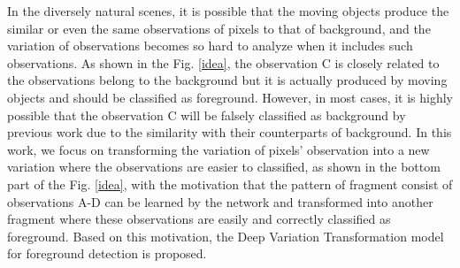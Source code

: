 \documentclass[journal]{IEEEtran}
\newcommand{\reffig}[1]{Fig. \ref{#1}}
\begin{document}
In the diversely natural scenes,
it is possible that the moving objects produce the similar or even the same observations of pixels to that of background,
and the variation of observations becomes so hard to analyze when it includes such observations.
As shown in the \reffig{idea},
the observation C is closely related to the observations belong to the background but it is actually produced by moving objects and should be classified as foreground.
However, in most cases, it is highly possible that the observation C will be falsely classified as background by previous work due to the similarity with their counterparts of background.
In this work, we focus on transforming the variation of pixels' observation into a new variation where the observations are easier to classified,
as shown in the bottom part of the \reffig{idea},
with the motivation that the pattern of fragment consist of observations A-D can be learned by the network and transformed into another fragment where these observations are easily and correctly classified as foreground.
Based on this motivation, the Deep Variation Transformation model for foreground detection is proposed.
% 
\end{document}
